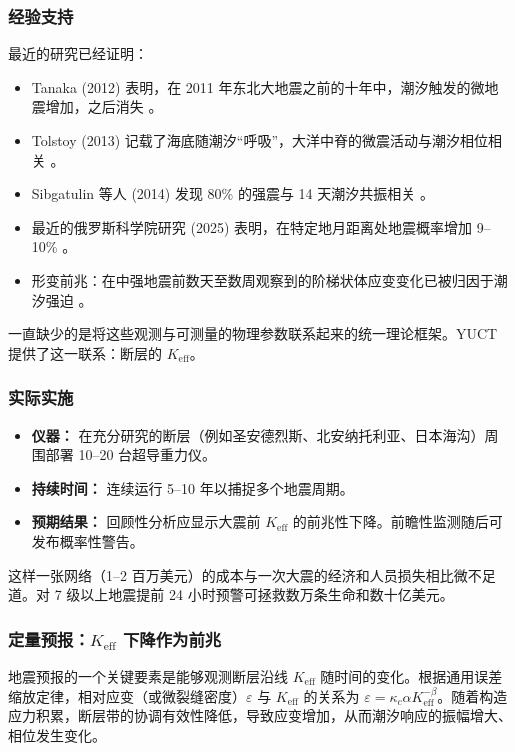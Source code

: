 \documentclass[12pt,a4paper]{article}
\theoremstyle{remark}
\begin{document}
	\subsubsection{经验支持}
	
	最近的研究已经证明：
	
	\begin{itemize}
		\item Tanaka (2012) 表明，在 2011 年东北大地震之前的十年中，潮汐触发的微地震增加，之后消失 \cite{Tanaka2012}。
		\item Tolstoy (2013) 记载了海底随潮汐“呼吸”，大洋中脊的微震活动与潮汐相位相关 \cite{Tolstoy2013}。
		\item Sibgatulin 等人 (2014) 发现 80\% 的强震与 14 天潮汐共振相关 \cite{Sibgatulin2014}。
		\item 最近的俄罗斯科学院研究 (2025) 表明，在特定地月距离处地震概率增加 9–10\% \cite{RAN2025}。
		\item 形变前兆：在中强地震前数天至数周观察到的阶梯状体应变变化已被归因于潮汐强迫 \cite{DeformationPrecursors2024}。
	\end{itemize}
	
	一直缺少的是将这些观测与可测量的物理参数联系起来的统一理论框架。YUCT 提供了这一联系：断层的 \(K_{\mathrm{eff}}\)。
	
	\subsubsection{实际实施}
	
	\begin{itemize}
		\item \textbf{仪器：} 在充分研究的断层（例如圣安德烈斯、北安纳托利亚、日本海沟）周围部署 10–20 台超导重力仪。
		\item \textbf{持续时间：} 连续运行 5–10 年以捕捉多个地震周期。
		\item \textbf{预期结果：} 回顾性分析应显示大震前 \(K_{\mathrm{eff}}\) 的前兆性下降。前瞻性监测随后可发布概率性警告。
	\end{itemize}
	
	这样一张网络（1–2 百万美元）的成本与一次大震的经济和人员损失相比微不足道。对 7 级以上地震提前 24 小时预警可拯救数万条生命和数十亿美元。
	
	\subsubsection{定量预报：\(K_{\mathrm{eff}}\) 下降作为前兆}
	\label{subsubsec:precursor}
	
	地震预报的一个关键要素是能够观测断层沿线 \(K_{\mathrm{eff}}\) 随时间的变化。根据通用误差缩放定律，相对应变（或微裂缝密度）\(\varepsilon\) 与 \(K_{\mathrm{eff}}\) 的关系为 \(\varepsilon = \kappa_c \alpha K_{\mathrm{eff}}^{-\beta}\)。随着构造应力积累，断层带的协调有效性降低，导致应变增加，从而潮汐响应的振幅增大、相位发生变化。
	
\end{document}
